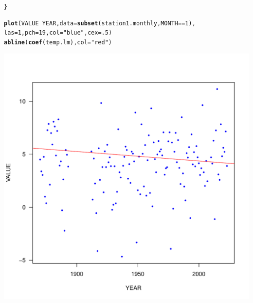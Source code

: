 \documentclass{article}\usepackage[]{graphicx}\usepackage[]{xcolor}
\makeatletter
\def\maxwidth{ %
  \ifdim\Gin@nat@width>\linewidth
    \linewidth
  \else
    \Gin@nat@width
  \fi
}
\newcommand{\hlnum}[1]{\textcolor[rgb]{0.686,0.059,0.569}{#1}}%
\newcommand{\hlstr}[1]{\textcolor[rgb]{0.192,0.494,0.8}{#1}}%
\newcommand{\hlopt}[1]{\textcolor[rgb]{0,0,0}{#1}}%
\newcommand{\hlstd}[1]{\textcolor[rgb]{0.345,0.345,0.345}{#1}}%
\newcommand{\hlkwc}[1]{\textcolor[rgb]{0.333,0.667,0.333}{#1}}%
\newcommand{\hlkwd}[1]{\textcolor[rgb]{0.737,0.353,0.396}{\textbf{#1}}}%
\newenvironment{kframe}{%
 \def\at@end@of@kframe{}%
 \ifinner\ifhmode%
  \def\at@end@of@kframe{\end{minipage}}%
  \begin{minipage}{\columnwidth}%
 \fi\fi%
 \def\FrameCommand##1{\hskip\@totalleftmargin \hskip-\fboxsep
 \colorbox{shadecolor}{##1}\hskip-\fboxsep
     \hskip-\linewidth \hskip-\@totalleftmargin \hskip\columnwidth}%
 \MakeFramed {\advance\hsize-\width
   \@totalleftmargin\z@ \linewidth\hsize
   \@setminipage}}%
 {\par\unskip\endMakeFramed%
 \at@end@of@kframe}
\newenvironment{knitrout}{}{} %
\makeatother
\begin{document}
\begin{knitrout}
\begin{kframe}
\begin{alltt}
\hlstd{\}}

\hlkwd{plot}\hlstd{(VALUE} \hlopt{~} \hlstd{YEAR,} \hlkwc{data} \hlstd{=} \hlkwd{subset}\hlstd{(station1.monthly, MONTH} \hlopt{==} \hlnum{1}\hlstd{),}
     \hlkwc{las}\hlstd{=}\hlnum{1}\hlstd{,} \hlkwc{pch}\hlstd{=}\hlnum{19}\hlstd{,} \hlkwc{col} \hlstd{=} \hlstr{"blue"}\hlstd{,} \hlkwc{cex}\hlstd{=}\hlnum{.5}\hlstd{)}
\hlkwd{abline}\hlstd{(}\hlkwd{coef}\hlstd{(temp.lm),} \hlkwc{col} \hlstd{=} \hlstr{"red"}\hlstd{)}
\end{alltt}
\end{kframe}
\includegraphics[width=\maxwidth]{figure/unnamed-chunk-6-1} 
\end{knitrout}
\end{document}

